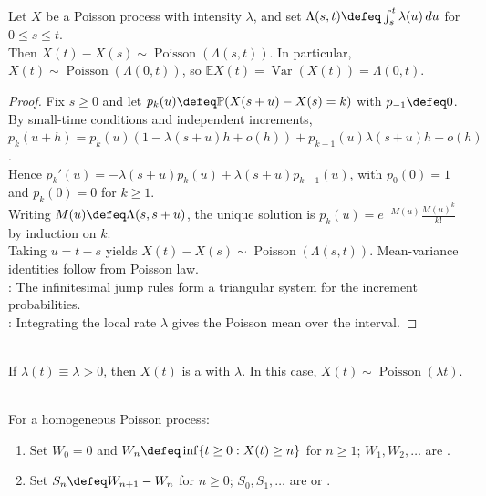 \begin{theorem} \label{thm:poisson-process-increments-distribution} \\
Let $X$ be a Poisson process with intensity $\lambda$, and set $\Lambda(s,t)\defeq\int_s^t\lambda(u)\,du$ for $0\leq s\leq t$.\\
Then $X(t)-X(s)\sim\operatorname{Poisson}(\Lambda(s,t))$. In particular, $X(t)\sim\operatorname{Poisson}(\Lambda(0,t))$, so $\mathbb{E}X(t)=\operatorname{Var}(X(t))=\Lambda(0,t)$.
\begin{proof} Fix $s\geq0$ and let $p_k(u)\defeq\mathbb{P}(X(s+u)-X(s)=k)$ with $p_{-1}\defeq0$. By small-time conditions and independent increments, $p_k(u+h)=p_k(u)(1-\lambda(s+u)h+o(h))+p_{k-1}(u)\lambda(s+u)h+o(h)$.\\
Hence $p_k'(u)=-\lambda(s+u)p_k(u)+\lambda(s+u)p_{k-1}(u)$, with $p_0(0)=1$ and $p_k(0)=0$ for $k\geq1$.\\
Writing $M(u)\defeq\Lambda(s,s+u)$, the unique solution is $p_k(u)=e^{-M(u)}\frac{M(u)^k}{k!}$ by induction on $k$.\\
Taking $u=t-s$ yields $X(t)-X(s)\sim\operatorname{Poisson}(\Lambda(s,t))$. Mean-variance identities follow from Poisson law.\\
: The infinitesimal jump rules form a triangular system for the increment probabilities.\\
: Integrating the local rate $\lambda$ gives the Poisson mean over the interval.
\end{proof}
\end{theorem}

\begin{definition} \label{def:homogeneous-poisson-process} \\
If $\lambda(t)\equiv\lambda>0$, then $X(t)$ is a  with  $\lambda$. In this case, $X(t)\sim\operatorname{Poisson}(\lambda t)$.
\end{definition}

\begin{definition} \label{def:poisson-waiting-sojourn-times} \\
For a homogeneous Poisson process:
\begin{enumerate}[label=(\roman*)]
\setlength{\itemsep}{0pt}
\item Set $W_0=0$ and $W_n\defeq\inf\{t\geq0:X(t)\geq n\}$ for $n\geq1$; $W_1,W_2,\ldots$ are .
\item Set $S_n\defeq W_{n+1}-W_n$ for $n\geq0$; $S_0,S_1,\ldots$ are  or .
\end{enumerate}
\end{definition}

